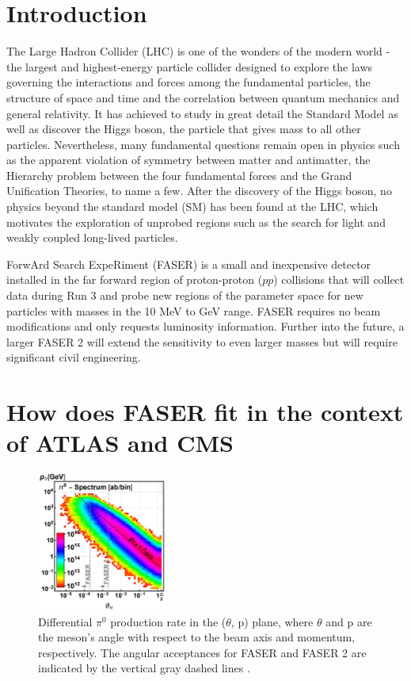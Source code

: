 \section{Introduction} %

The Large Hadron Collider (LHC) is one of the wonders of the modern world - the largest and highest-energy particle collider designed to explore the laws governing the interactions and forces among the fundamental particles, the structure of space and time and the correlation between quantum mechanics and general relativity. It has achieved to study in great detail the Standard Model as well as discover the Higgs boson, the particle that gives mass to all other particles. Nevertheless, many fundamental questions remain open in physics such as the apparent violation of symmetry between matter and antimatter, the Hierarchy problem between the four fundamental forces and the Grand Unification Theories, to name a few.
After the discovery of the Higgs boson, no physics beyond the standard model (SM) has been found at the LHC, which motivates the exploration of unprobed regions such as the search for light and weakly coupled long-lived particles.

ForwArd Search ExpeRiment (FASER) is a small and inexpensive detector installed in the far forward region of proton-proton ($pp$) collisions that will collect data during Run 3 and probe new regions of the parameter space for new particles with masses in the 10 MeV to GeV range.
FASER requires no beam modifications and only requests luminosity  information. Further into the future, a larger
 FASER 2 will extend the sensitivity to even larger masses but will require significant civil engineering.

\section{How does FASER fit in the context of ATLAS and CMS}  %
\label{section1.3}

\begin{figure}
  \centering
    \includegraphics[width=0.38\textwidth]{Introduction/Figs/Raster/momentumVSangle.jpg} 
    \caption[Momentum vs angle]{Differential $\pi^{0}$ production rate in the ($\theta$, p) plane, where $\theta$ and p are the meson’s angle with respect to the beam axis and momentum, respectively. The angular acceptances for FASER and FASER 2 are indicated by the vertical gray dashed lines \cite{faser_collaboration_fasers_2019}.}
    \label{fig:momentumVSangle}
\end{figure}

